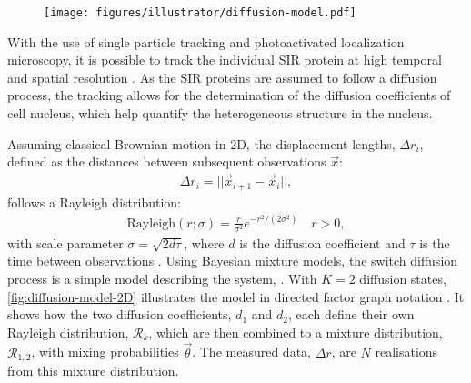 \begin{figure}[htbp]
    \centering
    \texttt{[image: figures/illustrator/diffusion-model.pdf]}
\end{figure}

With the use of single particle tracking and photoactivated localization microscopy, it is possible to track the individual SIR protein at high temporal and spatial resolution \autocite{oswaldImagingQuantificationTransmembrane2014,manleyHighdensityMappingSinglemolecule2008}. As the SIR proteins are assumed to follow a diffusion process, the tracking allows for the determination of the diffusion coefficients of cell nucleus, which help quantify the heterogeneous structure in the nucleus.

Assuming classical Brownian motion in 2D, the displacement lengths, $\Delta r_i$, defined as the distances between subsequent observations $\vec{x}$:
\begin{align}
    \Delta r_i = || \vec{x}_{i+1} - \vec{x}_{i} ||,
\end{align}
follows a Rayleigh distribution:
\begin{align}
    \mathrm{Rayleigh}(r; \sigma) =\frac{r}{\sigma^2} e^{-r^2/(2\sigma^2)} \quad r>0,
\end{align}
with scale parameter $\sigma = \sqrt{2d\tau}$, where $d$ is the diffusion coefficient and $\tau$ is the time between observations \autocite{andersonTrackingCellSurface1992}
. Using Bayesian mixture models, the switch diffusion process is a simple model describing the system, \autocite{bakerInferenceDiffusionCoefficients2021}. With $K=2$ diffusion states, \autoref{fig:diffusion-model-2D} illustrates the model in directed factor graph notation \autocite{dietzDirectedFactorGraph2022}. It shows how the two diffusion coefficients, $d_1$ and $d_2$, each define their own Rayleigh distribution, $\mathcal{R}_k$, which are then combined to a mixture distribution, $\mathcal{R}_{1,2}$, with mixing probabilities $\vec{\theta}$. The measured data, $\Delta r$, are $N$ realisations from this mixture distribution.


